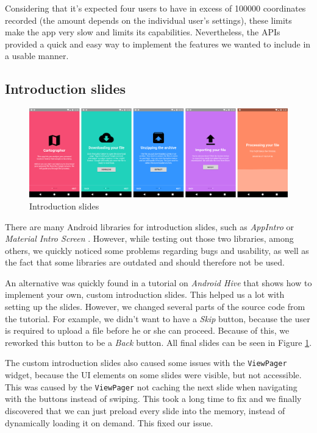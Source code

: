 \documentclass[12p]{article}
\begin{document}
            Considering that it's expected four users to have in excess of 100000 coordinates recorded (the amount depends on the individual user's settings), these limits make the app very slow and limits its capabilities. Nevertheless, the APIs provided a quick and easy way to implement the features we wanted to include in a usable manner.
            
            \subsection{Introduction slides}
            
            \begin{figure}[ht]
    		    \center
                \includegraphics[width=1\textwidth]{pics/app_design/intro_slides_comp}
                \caption{Introduction slides}
                \label{fig:introduction_slides}
            \end{figure}
            
            There are many Android libraries for introduction slides, such as \textit{AppIntro} \cite{AppIntro} or \textit{Material Intro Screen} \cite{MaterialIntroScreen}. However, while testing out those two libraries, among others, we quickly noticed some problems regarding bugs and usability, as well as the fact that some libraries are outdated and should therefore not be used. 
            
            An alternative was quickly found in a tutorial on \textit{Android Hive} \cite{IntroSlidesTutorial} that shows how to implement your own, custom introduction slides. This helped us a lot with setting up the slides. However, we changed several parts of the source code from the tutorial. For example, we didn't want to have a \textit{Skip} button, because the user is required to upload a file before he or she can proceed. Because of this, we reworked this button to be a \textit{Back} button. All final slides can be seen in Figure \ref{fig:introduction_slides}.
            
            The custom introduction slides also caused some issues with the \texttt{ViewPager} widget, because the UI elements on some slides were visible, but not accessible. This was caused by the \texttt{ViewPager} not caching the next slide when navigating with the buttons instead of swiping. This took a long time to fix and we finally discovered that we can just preload every slide into the memory, instead of dynamically loading it on demand. This fixed our issue.
            
\end{document}
